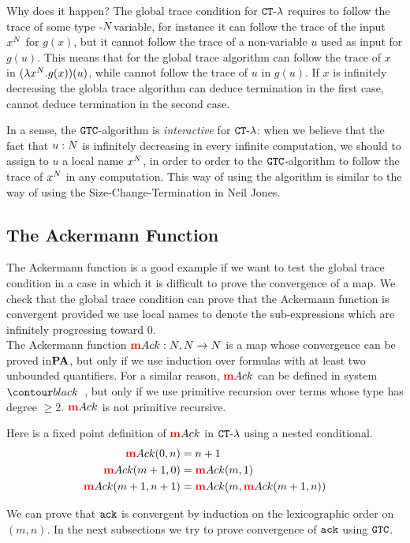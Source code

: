 Why does it happen? The global trace condition for ${ {\tt CT} \mbox{-} \lambda}$ requires to follow the trace of some
type -${N}$variable, for instance it can follow the trace of the input $x^{N}$ for $g(x)$, but it cannot
follow the trace of a non-variable $u$ used as input for $g(u)$. This means that for the
global trace algorithm can follow the trace of $x$ in $(\lambda x^{N}.g(x))(u)$,
while cannot follow the trace of $u$ in $g(u)$. If $x$ is infinitely decreasing the globla trace algorithm
can deduce termination in the first case, cannot deduce termination in the second case.
 
In a sense, the ${\tt GTC}$-algorithm is \emph{interactive} for ${ {\tt CT} \mbox{-} \lambda}$: when we believe that the
fact that $u:{N}$ is infinitely decreasing in every infinite computation, we should to assign to $u$
a local name $x^{N}$, in order to order to the ${\tt GTC}$-algorithm to follow the trace of $x^{N}$ in any
computation. This way of using the algorithm is similar to the way of using the Size-Change-Termination
in Neil Jones.


\subsection{The Ackermann Function}
The Ackermann function is a good example if we want to test the global trace 
condition in a case in which it is difficult to prove the convergence of a map. We check that the
global trace condition can prove that the Ackermann function is convergent provided we
use local names to denote the sub-expressions which are infinitely progressing toward $0$.
\\

The Ackermann function ${{{\bf \color{red}{m}}} Ack}:{N},{N}\rightarrow {N}$ is a map whose convergence can be
 proved in${\bf PA}$, but only if we use induction over formulas with at least two unbounded quantifiers. 
For a similar reason, ${{{\bf \color{red}{m}}} Ack}$ can be defined in system $\systemT$, but only if we use primitive recursion over
terms whose type has degree $ \ge 2$. ${{{\bf \color{red}{m}}} Ack}$ is not primitive recursive.


Here is a fixed point definition of ${{{\bf \color{red}{m}}} Ack}$ in ${ {\tt CT} \mbox{-} \lambda}$ using a nested conditional.
\begin{align*}
  {{{\bf \color{red}{m}}}Ack}(0,n) &= n+1
  \\
  {{{\bf \color{red}{m}}} Ack}(m+1,0) &= {{{\bf \color{red}{m}}} Ack}(m,1)
  \\
  {{{\bf \color{red}{m}}} Ack}(m+1,n+1) &= {{{\bf \color{red}{m}}} Ack}(m,{{{\bf \color{red}{m}}} Ack}(m+1,n))
\end{align*}

We can prove that ${\tt ack}$ is convergent by induction on the lexicographic order on $(m,n)$. 
In the next subsections we try to prove convergence of ${\tt ack}$ using ${\tt GTC}$.


